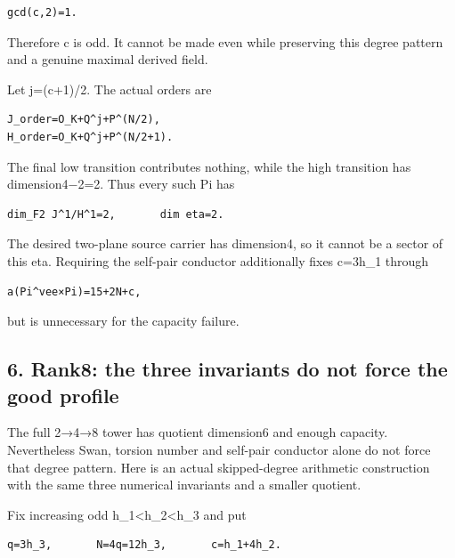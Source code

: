 \begin{Verbatim}[fontsize=\small,breaklines=true,breakanywhere=true]
gcd(c,2)=1.
\end{Verbatim}

Therefore c is odd. It cannot be made even while preserving this degree
pattern and a genuine maximal derived field.

Let j=(c+1)/2. The actual orders are

\begin{Verbatim}[fontsize=\small,breaklines=true,breakanywhere=true]
J_order=O_K+Q^j+P^(N/2),
H_order=O_K+Q^j+P^(N/2+1).
\end{Verbatim}

The final low transition contributes nothing, while the high transition
has dimension4−2=2. Thus every such Pi has

\begin{Verbatim}[fontsize=\small,breaklines=true,breakanywhere=true]
dim_F2 J^1/H^1=2,       dim eta=2.
\end{Verbatim}

The desired two-plane source carrier has dimension4, so it cannot be a
sector of this eta. Requiring the self-pair conductor additionally fixes
c=3h\_1 through

\begin{Verbatim}[fontsize=\small,breaklines=true,breakanywhere=true]
a(Pi^vee×Pi)=15+2N+c,
\end{Verbatim}

but is unnecessary for the capacity failure.

\hypertarget{dyadic_capacity-rank~8-the-three-invariants-do-not-force-the-good-profile}{%
\subsection{6. Rank8: the three invariants do not force the good
profile}\label{dyadic_capacity-rank~8-the-three-invariants-do-not-force-the-good-profile}}

The full 2→4→8 tower has quotient dimension6 and enough capacity.
Nevertheless Swan, torsion number and self-pair conductor alone do not
force that degree pattern. Here is an actual skipped-degree arithmetic
construction with the same three numerical invariants and a smaller
quotient.

Fix increasing odd h\_1\textless h\_2\textless h\_3 and put

\begin{Verbatim}[fontsize=\small,breaklines=true,breakanywhere=true]
q=3h_3,       N=4q=12h_3,       c=h_1+4h_2.
\end{Verbatim}

